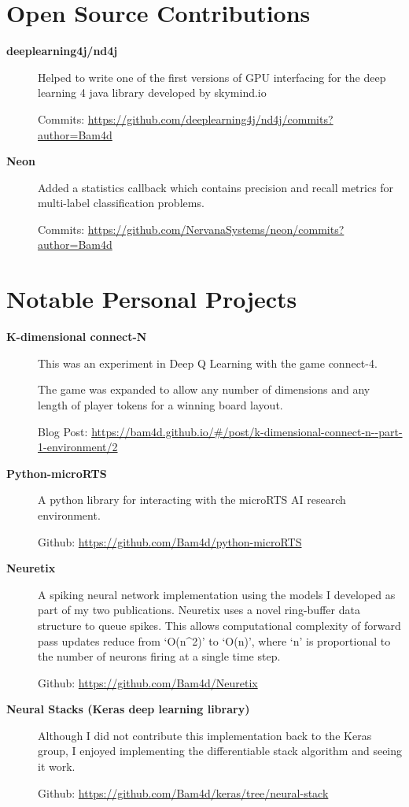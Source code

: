 \documentclass[a4paper]{article}
\def\tightlist{}
\begin{document}
\section{Open Source Contributions}\label{open-source-contributions}

\begin{description}
\tightlist
\item[\textbf{deeplearning4j/nd4j}]
Helped to write one of the first versions of GPU interfacing for the
deep learning 4 java library developed by skymind.io

Commits:
\url{https://github.com/deeplearning4j/nd4j/commits?author=Bam4d}
\item[\textbf{Neon}]
Added a statistics callback which contains precision and recall metrics
for multi-label classification problems.

Commits:
\url{https://github.com/NervanaSystems/neon/commits?author=Bam4d}
\end{description}

\section{Notable Personal Projects}\label{notable-personal-projects}

\begin{description}
\tightlist
\item[\textbf{K-dimensional connect-N}]
This was an experiment in Deep Q Learning with the game connect-4.

The game was expanded to allow any number of dimensions and any length
of player tokens for a winning board layout.

Blog Post:
\url{https://bam4d.github.io/\#/post/k-dimensional-connect-n--part-1-environment/2}
\item[\textbf{Python-microRTS}]
A python library for interacting with the microRTS AI research
environment.

Github: \url{https://github.com/Bam4d/python-microRTS}
\item[\textbf{Neuretix}]
A spiking neural network implementation using the models I developed as
part of my two publications. Neuretix uses a novel ring-buffer data
structure to queue spikes. This allows computational complexity of
forward pass updates reduce from `O(n\^{}2)' to `O(n)', where `n' is
proportional to the number of neurons firing at a single time step.

Github: \url{https://github.com/Bam4d/Neuretix}
\item[\textbf{Neural Stacks (Keras deep learning library)}]
Although I did not contribute this implementation back to the Keras
group, I enjoyed implementing the differentiable stack algorithm and
seeing it work.

Github: \url{https://github.com/Bam4d/keras/tree/neural-stack}
\end{description}
\end{document}
